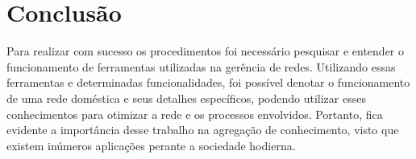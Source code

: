 \documentclass[12pt]{article}
\begin{document}
\section{Conclusão}

Para realizar com sucesso os procedimentos foi necessário pesquisar e entender o funcionamento de ferramentas utilizadas na gerência de redes. Utilizando essas ferramentas e determinadas funcionalidades, foi possível denotar o funcionamento de uma rede doméstica e seus detalhes específicos, podendo utilizar esses conhecimentos para otimizar a rede e os processos envolvidos. Portanto, fica evidente a importância desse trabalho na agregação de conhecimento, visto que existem inúmeros aplicações perante a sociedade hodierna.

\nocite{*}
\medskip



\end{document}
